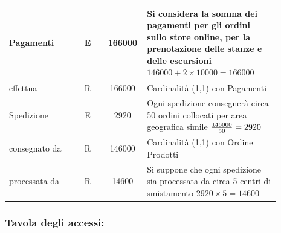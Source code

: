 \documentclass[12pt,a4paper]{article}
\begin{document}
\begin{center}
\begin{longtable}{|p{0.23\linewidth}|p{0.1\linewidth}|p{0.11\linewidth}|p{0.45\linewidth}|}
\hline
Pagamenti
 & 
\multicolumn{1}{|c|}{E}
 & 
\multicolumn{1}{|c|}{166000}
 & 
Si considera la somma dei pagamenti per gli ordini sullo store online, per la prenotazione delle stanze e delle escursioni $146000+2\times 10000= 166000$
\\

\hline
effettua
 & 
\multicolumn{1}{|c|}{R}
 & 
\multicolumn{1}{|c|}{166000}
 & 
Cardinalità (1,1) con Pagamenti
\\

\hline
Spedizione
 & 
\multicolumn{1}{|c|}{E}
 & 
\multicolumn{1}{|c|}{2920}
 & 
Ogni spedizione consegnerà circa 50 ordini collocati per area geografica simile ${146000\over 50}=2920$
\\

\hline
consegnato da
 & 
\multicolumn{1}{|c|}{R}
 & 
\multicolumn{1}{|c|}{146000}
 & 
Cardinalità (1,1) con Ordine Prodotti
\\

\hline
processata da
 & 
\multicolumn{1}{|c|}{R}
 & 
\multicolumn{1}{|c|}{14600}
 & 
Si suppone che ogni spedizione sia processata da circa 5 centri di smistamento $2920\times 5=14600$
\\

\hline

\end{longtable}\end{center}
\subsubsection*{Tavola degli accessi:}
\end{document}
